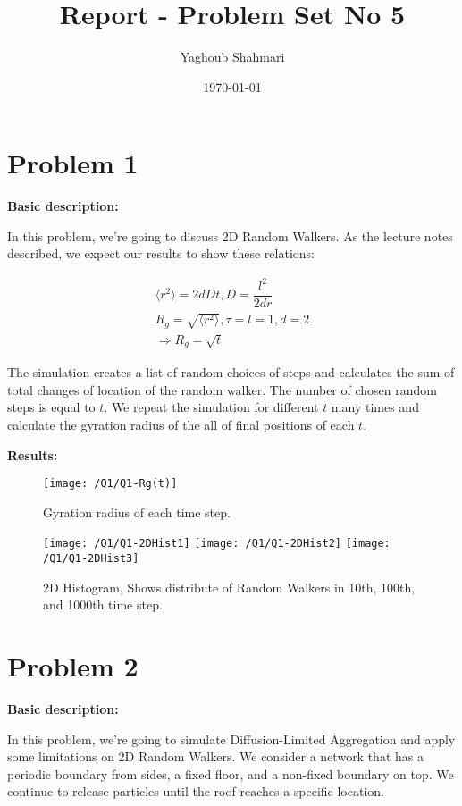 \documentclass{article}
\author{Yaghoub Shahmari}
\title{Report - Problem Set No 5}
\date{\today}
\begin{document}
    \maketitle
    \section*{Problem 1}
    \textbf{Basic description:}

    In this problem, we're going to discuss 2D Random Walkers.
    As the lecture notes described, we expect our results to show these relations:

    \begin{gather*}
        \langle r^{2}\rangle =2dDt,D=\dfrac{l^{2}}{2dr}\\
        R_{g}=\sqrt{\langle r^{2}\rangle },\tau =l=1,d=2\\
        \Rightarrow R_{g}=\sqrt{t}
    \end{gather*}
    
    The simulation creates a list of random choices of steps
    and calculates the sum of total changes of location of the random walker.
    The number of chosen random steps is equal to $t$.
    We repeat the simulation for different $t$ many times
    and calculate the gyration radius of the all of final positions of each $t$.

    \textbf{Results:}

    \begin{figure}[!htb]
        \centering
        \texttt{[image: /Q1/Q1-Rg(t)]}
        \label{fig:1.1}
        \caption{Gyration radius of each time step.}
    \end{figure}

    \begin{figure}[!htb]
        \centering
        \texttt{[image: /Q1/Q1-2DHist1]}
        \label{fig:1.2}
        \texttt{[image: /Q1/Q1-2DHist2]}
        \label{fig:1.3}
        \texttt{[image: /Q1/Q1-2DHist3]}
        \label{fig:1.4}
        \caption{2D Histogram, Shows distribute of Random Walkers in 10th, 100th, and 1000th time step.}
    \end{figure}

    \pagebreak

    \section*{Problem 2}
    \textbf{Basic description:}

    In this problem, we're going to simulate Diffusion-Limited Aggregation and apply some limitations on 2D Random Walkers.
    We consider a network that has a periodic boundary from sides,
    a fixed floor, and a non-fixed boundary on top.
    We continue to release particles until the roof reaches a specific location.
    
\end{document}
